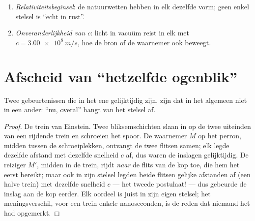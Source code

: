 \begin{theorem}\label{thm:g12:special-relativity:postulates}
\begin{enumerate}
  \item \emph{Relativiteitsbeginsel}: de natuurwetten hebben in elk
         dezelfde vorm; geen enkel stelsel is ``echt in
        rust''.
  \item \emph{Onveranderlijkheid van $c$}: licht in vacuüm reist in elk
         met $c = \qty{3.00e8}{m/s}$, hoe de bron of de
        waarnemer ook beweegt.
\end{enumerate}
\end{theorem}
\admitted

\section{Afscheid van ``hetzelfde ogenblik''}

\begin{proposition}\label{prop:g12:special-relativity:simultaneity}
Twee gebeurtenissen die in het ene  gelijktijdig zijn, zijn
dat in het algemeen niet in een ander: ``nu, overal'' hangt van het stelsel af.
\end{proposition}

\begin{proof}
De trein van Einstein. Twee bliksemschichten slaan in op de twee uiteinden van
een rijdende trein en schroeien het spoor. De waarnemer $M$ op het perron,
midden tussen de schroeiplekken, ontvangt de twee flitsen samen; elk legde
dezelfde afstand met dezelfde snelheid $c$ af, dus waren de inslagen
gelijktijdig. De reiziger $M'$, midden in de trein, rijdt \emph{naar} de flits
van de kop toe, die hem het eerst bereikt; maar ook in zijn stelsel legden
beide flitsen gelijke afstanden af (een halve trein) met dezelfde snelheid $c$
--- het tweede postulaat! --- dus gebeurde de inslag aan de kop eerder. Elk
oordeel is juist in zijn eigen stelsel; het meningsverschil, voor een trein
enkele nanoseconden, is de reden dat niemand het had opgemerkt.
\end{proof}


